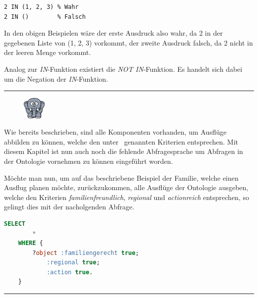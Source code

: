 \begin{lstlisting}
2 IN (1, 2, 3) % Wahr
2 IN ()        % Falsch
\end{lstlisting}
In den obigen Beispielen wäre der erste Ausdruck also wahr, da 2 in der gegebenen Liste von (1, 2, 3) vorkommt, der zweite Ausdruck falsch, da 2 nicht in der leeren Menge vorkommt.

Analog zur \textit{IN}-Funktion existiert die \textit{NOT IN}-Funktion. Es handelt sich dabei um die Negation der \textit{IN}-Funktion.


\noindent\rule[1ex]{\textwidth}{1pt}
\begin{figure}
    \vspace{-12pt}
    \includegraphics[width=0.1\textwidth]{bilder/elephant.png}
\end{figure}
Wie bereits beschrieben, sind alle Komponenten vorhanden, um Ausflüge abbilden zu können, welche den unter~\hyperref[elephant_graph_data]{} genannten Kriterien entsprechen. Mit diesem Kapitel ist nun auch noch die fehlende Abfragesprache um Abfragen in der Ontologie vornehmen zu können eingeführt worden.

Möchte man nun, um auf das beschriebene Beispiel der Familie, welche einen Ausflug planen möchte, zurückzukommen, alle Ausflüge der Ontologie ausgeben, welche den Kriterien  \textit{familienfreundlich}, \textit{regional} und \textit{actionreich} entsprechen, so gelingt dies mit der nacholgenden Abfrage.

\begin{lstlisting}[caption={Beispiel einer Abfrage um alle familiengerechten, actionreichen und regionalen Ausflüge der Ontologie auszugeben},captionpos=b,language=SQL]
    SELECT
        *
    WHERE {
        ?object :familiengerecht true;
            :regional true;
            :action true.
    }
\end{lstlisting}

\noindent\rule[1ex]{\textwidth}{1pt}
